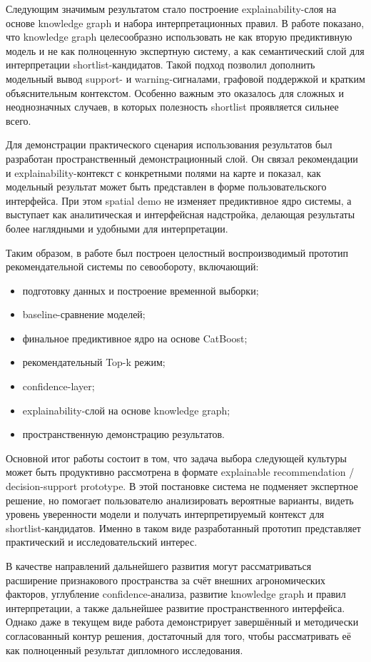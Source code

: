 Следующим значимым результатом стало построение explainability-слоя на основе knowledge graph и набора интерпретационных правил. В работе показано, что knowledge graph целесообразно использовать не как вторую предиктивную модель и не как полноценную экспертную систему, а как семантический слой для интерпретации shortlist-кандидатов. Такой подход позволил дополнить модельный вывод support- и warning-сигналами, графовой поддержкой и кратким объяснительным контекстом. Особенно важным это оказалось для сложных и неоднозначных случаев, в которых полезность shortlist проявляется сильнее всего.

Для демонстрации практического сценария использования результатов был разработан пространственный демонстрационный слой. Он связал рекомендации и explainability-контекст с конкретными полями на карте и показал, как модельный результат может быть представлен в форме пользовательского интерфейса. При этом spatial demo не изменяет предиктивное ядро системы, а выступает как аналитическая и интерфейсная надстройка, делающая результаты более наглядными и удобными для интерпретации.

Таким образом, в работе был построен целостный воспроизводимый прототип рекомендательной системы по севообороту, включающий:

\begin{itemize}
\tightlist
\item
  подготовку данных и построение временной выборки;
\item
  baseline-сравнение моделей;
\item
  финальное предиктивное ядро на основе CatBoost;
\item
  рекомендательный Top-k режим;
\item
  confidence-layer;
\item
  explainability-слой на основе knowledge graph;
\item
  пространственную демонстрацию результатов.
\end{itemize}

Основной итог работы состоит в том, что задача выбора следующей культуры может быть продуктивно рассмотрена в формате explainable recommendation / decision-support prototype. В этой постановке система не подменяет экспертное решение, но помогает пользователю анализировать вероятные варианты, видеть уровень уверенности модели и получать интерпретируемый контекст для shortlist-кандидатов. Именно в таком виде разработанный прототип представляет практический и исследовательский интерес.

В качестве направлений дальнейшего развития могут рассматриваться расширение признакового пространства за счёт внешних агрономических факторов, углубление confidence-анализа, развитие knowledge graph и правил интерпретации, а также дальнейшее развитие пространственного интерфейса. Однако даже в текущем виде работа демонстрирует завершённый и методически согласованный контур решения, достаточный для того, чтобы рассматривать её как полноценный результат дипломного исследования.
